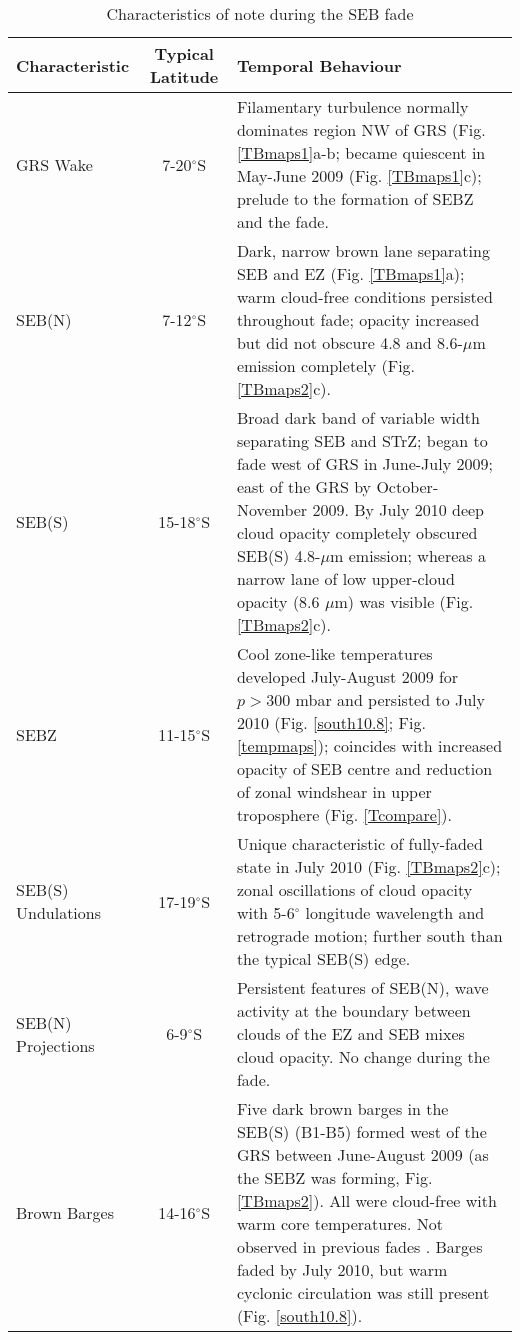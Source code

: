 \documentclass[final,5p,times,twocolumn,authoryear]{elsarticle}
\begin{document}
\begin{table*}[htdp]
\caption{Characteristics of note during the SEB fade}
\begin{center}
\begin{tabular}{|l|c|p{12cm}|}
\hline
\textbf{Characteristic} & \textbf{Typical Latitude} & \textbf{Temporal Behaviour}  \\
\hline

GRS Wake & 7-20$^\circ$S  & Filamentary turbulence normally dominates region NW of GRS (Fig. \ref{TBmaps1}a-b; became quiescent in May-June 2009 (Fig. \ref{TBmaps1}c); prelude to the formation of SEBZ and the fade.\\
\hline
SEB(N) & 7-12$^\circ$S & Dark, narrow brown lane separating SEB and EZ (Fig. \ref{TBmaps1}a); warm cloud-free conditions persisted throughout fade; opacity increased but did not obscure 4.8 and 8.6-$\mu$m emission completely (Fig. \ref{TBmaps2}c).  \\
\hline
SEB(S) & 15-18$^\circ$S & Broad dark band of variable width separating SEB and STrZ; began to fade west of GRS in June-July 2009; east of the GRS by October-November 2009.   By July 2010 deep cloud opacity completely obscured SEB(S) 4.8-$\mu$m emission; whereas a narrow lane of low upper-cloud opacity (8.6 $\mu$m) was visible (Fig. \ref{TBmaps2}c). \\
\hline
SEBZ & 11-15$^\circ$S & Cool zone-like temperatures developed July-August 2009 for $p>300$ mbar and persisted to July 2010 (Fig. \ref{south10.8}; Fig. \ref{tempmaps}); coincides with increased opacity of SEB centre and reduction of zonal windshear in upper troposphere (Fig. \ref{Tcompare}).\\
\hline
SEB(S) Undulations & 17-19$^\circ$S & Unique characteristic of fully-faded state in July 2010 (Fig. \ref{TBmaps2}c); zonal oscillations of cloud opacity with 5-6$^\circ$ longitude wavelength and retrograde motion; further south than the typical SEB(S) edge. \\
\hline
SEB(N) Projections & 6-9$^\circ$S & Persistent features of SEB(N), wave activity at the boundary between clouds of the EZ and SEB mixes cloud opacity.  No change during the fade.  \\
\hline
Brown Barges & 14-16$^\circ$S & Five dark brown barges in the SEB(S) (B1-B5) formed west of the GRS between June-August 2009 (as the SEBZ was forming, Fig. \ref{TBmaps2}).  All were cloud-free with warm core temperatures.  Not observed in previous fades \citep{96sanchez_jup}.  Barges faded by July 2010, but warm cyclonic circulation was still present (Fig. \ref{south10.8}).\\

\end{tabular}
\end{center}
\end{table*}
\end{document}
